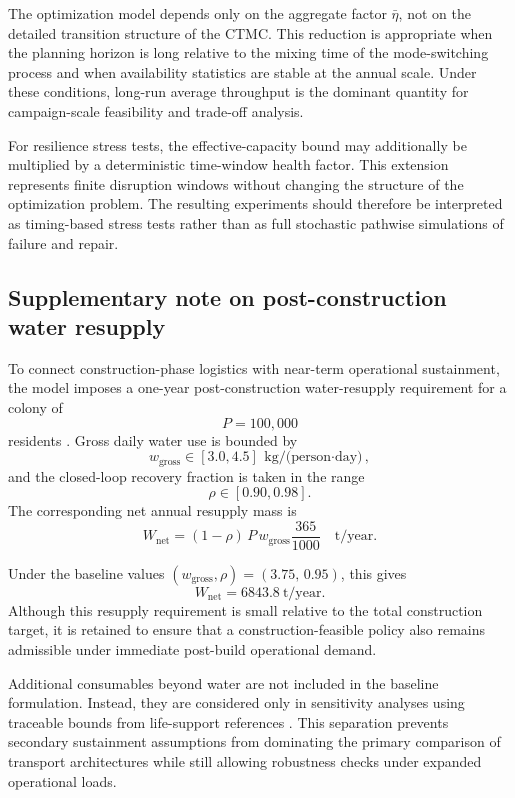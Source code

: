 \documentclass[12pt]{article}
\begin{document}
The optimization model depends only on the aggregate factor $\bar{\eta}$, not on the detailed transition structure of the CTMC. This reduction is appropriate when the planning horizon is long relative to the mixing time of the mode-switching process and when availability statistics are stable at the annual scale. Under these conditions, long-run average throughput is the dominant quantity for campaign-scale feasibility and trade-off analysis.

For resilience stress tests, the effective-capacity bound may additionally be multiplied by a deterministic time-window health factor. This extension represents finite disruption windows without changing the structure of the optimization problem. The resulting experiments should therefore be interpreted as timing-based stress tests rather than as full stochastic pathwise simulations of failure and repair.

\subsection{Supplementary note on post-construction water resupply}
\label{app:water_extra}

To connect construction-phase logistics with near-term operational sustainment, the model imposes a one-year post-construction water-resupply requirement for a colony of
\[
P=100{,}000
\]
residents \cite{COMAP2026B}. Gross daily water use is bounded by
\[
w_{\mathrm{gross}}\in[3.0,4.5]\ \text{kg/(person$\cdot$day)},
\]
and the closed-loop recovery fraction is taken in the range
\[
\rho\in[0.90,0.98].
\]
The corresponding net annual resupply mass is
\[
W_{\mathrm{net}}=(1-\rho)\,P\,w_{\mathrm{gross}}\frac{365}{1000}
\quad \text{t/year}.
\]

Under the baseline values $(w_{\mathrm{gross}},\rho)=(3.75,\,0.95)$, this gives
\[
W_{\mathrm{net}}=6843.8\ \text{t/year}.
\]
Although this resupply requirement is small relative to the total construction target, it is retained to ensure that a construction-feasible policy also remains admissible under immediate post-build operational demand.

Additional consumables beyond water are not included in the baseline formulation. Instead, they are considered only in sensitivity analyses using traceable bounds from life-support references \cite{Ewert2022BVAD}. This separation prevents secondary sustainment assumptions from dominating the primary comparison of transport architectures while still allowing robustness checks under expanded operational loads.
\end{document}
